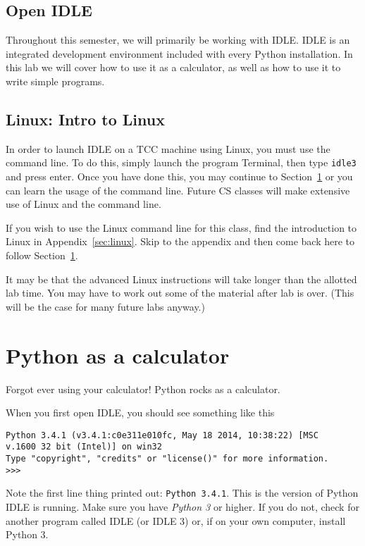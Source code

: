 \documentclass[12pt,hidelinks]{article}
\begin{document}
\subsection{Open IDLE}
Throughout this semester, we will primarily be working with IDLE. IDLE is an
integrated development environment included with every Python installation. In
this lab we will cover how to use it as a calculator, as well as how to use it
to write simple programs.

\subsection{Linux: Intro to Linux}

In order to launch IDLE on a TCC machine using Linux, you must use the command
line. To do this, simply launch the program Terminal, then type \texttt{idle3} and
press enter. Once you have done this, you may continue to 
Section~\ref{sec:python-calc} or you can learn the usage of the command line.
Future CS classes will make extensive use of Linux and the command line.

If you wish to use the Linux command line for this class, find the introduction
to Linux in Appendix~\ref{sec:linux}. Skip to the appendix and then come back
here to follow Section~\ref{sec:python-calc}.

It may be that the advanced Linux instructions will take longer than the allotted lab
time. You may have to work out some of the material after lab is over. (This
will be the case for many future labs anyway.)

\pagebreak
\section{Python as a calculator}
\label{sec:python-calc}
Forgot ever using your calculator! Python rocks as a calculator.

When you first open IDLE, you should see something like this
\begin{lstlisting}[style=bash]
Python 3.4.1 (v3.4.1:c0e311e010fc, May 18 2014, 10:38:22) [MSC
v.1600 32 bit (Intel)] on win32
Type "copyright", "credits" or "license()" for more information.
>>> 
\end{lstlisting}

Note the first line thing printed out: \texttt{Python 3.4.1}. This is the
version of Python IDLE is running. Make sure you have \emph{Python 3} or higher.
If you do not, check for another program called IDLE (or IDLE 3) or, if on your
own computer, install Python 3.
\end{document}
